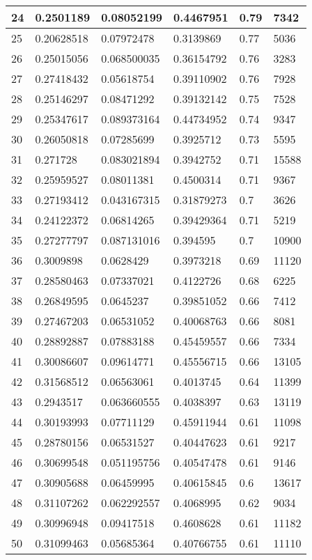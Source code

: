 \begin{longtable}{|l|l|l|l|l|l|}
24 & 0.2501189 & 0.08052199 & 0.4467951 & 0.79 & 7342 \\ \hline 
25 & 0.20628518 & 0.07972478 & 0.3139869 & 0.77 & 5036 \\ \hline 
26 & 0.25015056 & 0.068500035 & 0.36154792 & 0.76 & 3283 \\ \hline 
27 & 0.27418432 & 0.05618754 & 0.39110902 & 0.76 & 7928 \\ \hline 
28 & 0.25146297 & 0.08471292 & 0.39132142 & 0.75 & 7528 \\ \hline 
29 & 0.25347617 & 0.089373164 & 0.44734952 & 0.74 & 9347 \\ \hline 
30 & 0.26050818 & 0.07285699 & 0.3925712 & 0.73 & 5595 \\ \hline 
31 & 0.271728 & 0.083021894 & 0.3942752 & 0.71 & 15588 \\ \hline 
32 & 0.25959527 & 0.08011381 & 0.4500314 & 0.71 & 9367 \\ \hline 
33 & 0.27193412 & 0.043167315 & 0.31879273 & 0.7 & 3626 \\ \hline 
34 & 0.24122372 & 0.06814265 & 0.39429364 & 0.71 & 5219 \\ \hline 
35 & 0.27277797 & 0.087131016 & 0.394595 & 0.7 & 10900 \\ \hline 
36 & 0.3009898 & 0.0628429 & 0.3973218 & 0.69 & 11120 \\ \hline 
37 & 0.28580463 & 0.07337021 & 0.4122726 & 0.68 & 6225 \\ \hline 
38 & 0.26849595 & 0.0645237 & 0.39851052 & 0.66 & 7412 \\ \hline 
39 & 0.27467203 & 0.06531052 & 0.40068763 & 0.66 & 8081 \\ \hline 
40 & 0.28892887 & 0.07883188 & 0.45459557 & 0.66 & 7334 \\ \hline 
41 & 0.30086607 & 0.09614771 & 0.45556715 & 0.66 & 13105 \\ \hline 
42 & 0.31568512 & 0.06563061 & 0.4013745 & 0.64 & 11399 \\ \hline 
43 & 0.2943517 & 0.063660555 & 0.4038397 & 0.63 & 13119 \\ \hline 
44 & 0.30193993 & 0.07711129 & 0.45911944 & 0.61 & 11098 \\ \hline 
45 & 0.28780156 & 0.06531527 & 0.40447623 & 0.61 & 9217 \\ \hline 
46 & 0.30699548 & 0.051195756 & 0.40547478 & 0.61 & 9146 \\ \hline 
47 & 0.30905688 & 0.06459995 & 0.40615845 & 0.6 & 13617 \\ \hline 
48 & 0.31107262 & 0.062292557 & 0.4068995 & 0.62 & 9034 \\ \hline 
49 & 0.30996948 & 0.09417518 & 0.4608628 & 0.61 & 11182 \\ \hline 
50 & 0.31099463 & 0.05685364 & 0.40766755 & 0.61 & 11110 \\ \hline 
\end{longtable}